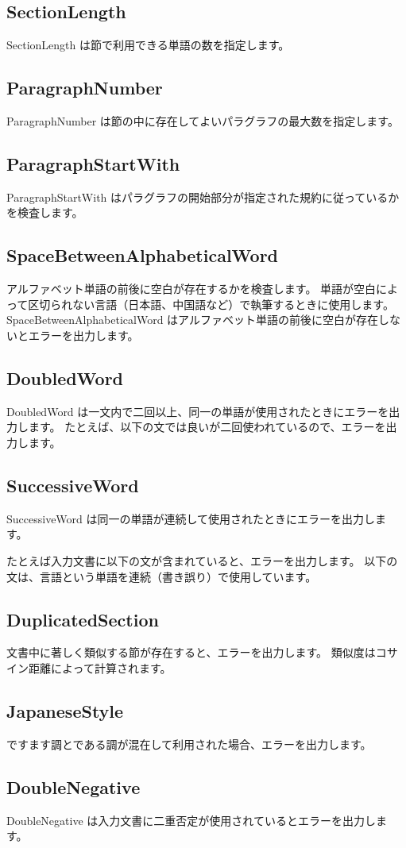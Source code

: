 \subsection{SectionLength}
SectionLength は節で利用できる単語の数を指定します。
\subsection{ParagraphNumber}
ParagraphNumber は節の中に存在してよいパラグラフの最大数を指定します。

\subsection{ParagraphStartWith}
ParagraphStartWith はパラグラフの開始部分が指定された規約に従っているかを検査します。
\subsection{SpaceBetweenAlphabeticalWord}
アルファベット単語の前後に空白が存在するかを検査します。 単語が空白によって区切られない言語（日本語、中国語など）で執筆するときに使用します。 SpaceBetweenAlphabeticalWord はアルファベット単語の前後に空白が存在しないとエラーを出力します。
\subsection{DoubledWord}
DoubledWord は一文内で二回以上、同一の単語が使用されたときにエラーを出力します。 たとえば、以下の文では良いが二回使われているので、エラーを出力します。
\subsection{SuccessiveWord}
SuccessiveWord は同一の単語が連続して使用されたときにエラーを出力します。

たとえば入力文書に以下の文が含まれていると、エラーを出力します。 以下の文は、言語という単語を連続（書き誤り）で使用しています。
\subsection{DuplicatedSection}
文書中に著しく類似する節が存在すると、エラーを出力します。 類似度はコサイン距離によって計算されます。
\subsection{JapaneseStyle}
ですます調とである調が混在して利用された場合、エラーを出力します。
\subsection{DoubleNegative}
DoubleNegative は入力文書に二重否定が使用されているとエラーを出力します。

